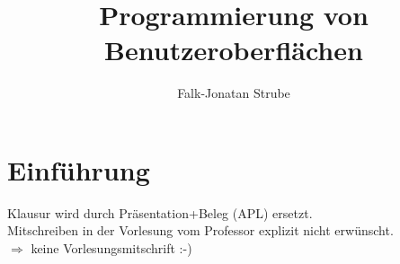 \documentclass{scrreprt}
\title{Programmierung von Benutzeroberflächen}
\author{Falk-Jonatan Strube}
\begin{document}
\maketitle

\chapter*{Einführung}
Klausur wird durch Präsentation+Beleg (APL) ersetzt. \\
Mitschreiben in der Vorlesung vom Professor explizit nicht erwünscht.\\
$\Rightarrow$ keine Vorlesungsmitschrift :-)

\end{document}
